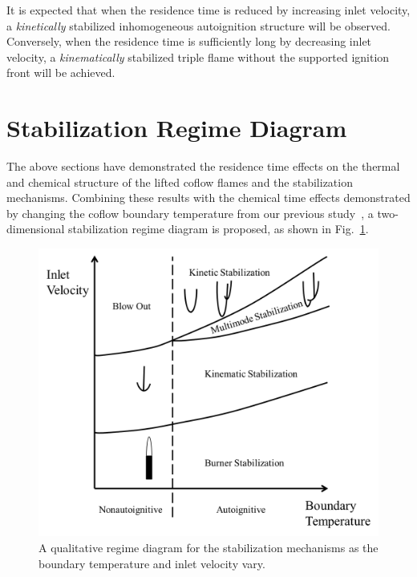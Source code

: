 \documentclass[review,3p,times]{elsarticle}
\begin{document}
\textcolor{dl}{It is expected that when the residence time is reduced by increasing inlet velocity, a \emph{kinetically} stabilized inhomogeneous autoignition structure will be observed.  Conversely, when the residence time is sufficiently long by decreasing inlet velocity, a \emph{kinematically} stabilized triple flame without the supported ignition front will be achieved.}
       
\section{Stabilization Regime Diagram}

The above sections have demonstrated the residence time effects on the thermal and chemical structure of the lifted coflow flames and the stabilization mechanisms.  Combining these results with the chemical time effects demonstrated by changing the coflow boundary temperature from our previous study~\cite{deng15}, a two-dimensional stabilization regime diagram is proposed, as shown in Fig.~\ref{fig:2D-regime}.   

\begin{figure}
  \centering
  \scriptsize
  \vspace{-0.1in}
  \includegraphics[width=1.0\textwidth]{2D-regime.png}
  \normalsize
  \vspace{-0.1in}
  \caption{A qualitative regime diagram for the stabilization mechanisms as the boundary temperature and inlet velocity vary. }
  \label{fig:2D-regime}
\end{figure}
\end{document}
